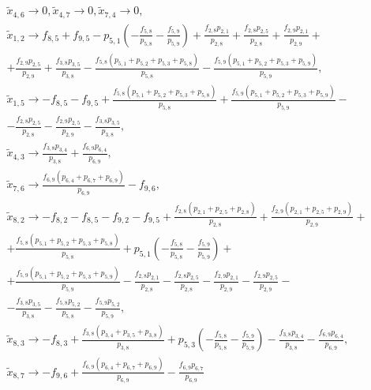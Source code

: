 \documentclass[14pt]{extarticle}%
\begin{document}
\begin{equation*}
\begin{gathered}
\tilde{x}_{4,6}\to 0, \tilde{x}_{4,7}\to 0, \tilde{x}_{7,4}\to 0,\\
\tilde{x}_{1,2}\to f_{8,5}+f_{9,5}-p_{5,1} \left(-\frac{f_{5,8}}{p_{5,8}}-\frac{f_{5,9}}{p_{5,9}}\right)+\frac{f_{2,8} p_{2,1}}{p_{2,8}}+\frac{f_{2,8} p_{2,5}}{p_{2,8}}+\frac{f_{2,9} p_{2,1}}{p_{2,9}}+\\
+\frac{f_{2,9} p_{2,5}}{p_{2,9}}+\frac{f_{3,8} p_{3,5}}{p_{3,8}}-\frac{f_{5,8} \left(p_{5,1}+p_{5,2}+p_{5,3}+p_{5,8}\right)}{p_{5,8}}-\frac{f_{5,9} \left(p_{5,1}+p_{5,2}+p_{5,3}+p_{5,9}\right)}{p_{5,9}},\\
\tilde{x}_{1,5}\to -f_{8,5}-f_{9,5}+\frac{f_{5,8} \left(p_{5,1}+p_{5,2}+p_{5,3}+p_{5,8}\right)}{p_{5,8}}+\frac{f_{5,9} \left(p_{5,1}+p_{5,2}+p_{5,3}+p_{5,9}\right)}{p_{5,9}}-\\-\frac{f_{2,8} p_{2,5}}{p_{2,8}}-\frac{f_{2,9} p_{2,5}}{p_{2,9}}-\frac{f_{3,8} p_{3,5}}{p_{3,8}},\\
\tilde{x}_{4,3}\to \frac{f_{3,8} p_{3,4}}{p_{3,8}}+\frac{f_{6,9} p_{6,4}}{p_{6,9}},\\
\tilde{x}_{7,6}\to \frac{f_{6,9} \left(p_{6,4}+p_{6,7}+p_{6,9}\right)}{p_{6,9}}-f_{9,6},\\
\tilde{x}_{8,2}\to -f_{8,2}-f_{8,5}-f_{9,2}-f_{9,5}+\frac{f_{2,8} \left(p_{2,1}+p_{2,5}+p_{2,8}\right)}{p_{2,8}}+\frac{f_{2,9} \left(p_{2,1}+p_{2,5}+p_{2,9}\right)}{p_{2,9}}+\\
+\frac{f_{5,8} \left(p_{5,1}+p_{5,2}+p_{5,3}+p_{5,8}\right)}{p_{5,8}}+p_{5,1} \left(-\frac{f_{5,8}}{p_{5,8}}-\frac{f_{5,9}}{p_{5,9}}\right)+\\
+\frac{f_{5,9} \left(p_{5,1}+p_{5,2}+p_{5,3}+p_{5,9}\right)}{p_{5,9}}-\frac{f_{2,8} p_{2,1}}{p_{2,8}}-\frac{f_{2,8} p_{2,5}}{p_{2,8}}-\frac{f_{2,9} p_{2,1}}{p_{2,9}}-\frac{f_{2,9} p_{2,5}}{p_{2,9}}-\\-\frac{f_{3,8} p_{3,5}}{p_{3,8}}-\frac{f_{5,8} p_{5,2}}{p_{5,8}}-\frac{f_{5,9} p_{5,2}}{p_{5,9}},\\
\tilde{x}_{8,3}\to -f_{8,3}+\frac{f_{3,8} \left(p_{3,4}+p_{3,5}+p_{3,8}\right)}{p_{3,8}}+p_{5,3} \left(-\frac{f_{5,8}}{p_{5,8}}-\frac{f_{5,9}}{p_{5,9}}\right)-\frac{f_{3,8} p_{3,4}}{p_{3,8}}-\frac{f_{6,9} p_{6,4}}{p_{6,9}},\\
\tilde{x}_{8,7}\to -f_{9,6}+\frac{f_{6,9} \left(p_{6,4}+p_{6,7}+p_{6,9}\right)}{p_{6,9}}-\frac{f_{6,9} p_{6,7}}{p_{6,9}}
\end{gathered}
\end{equation*}
\end{document}
